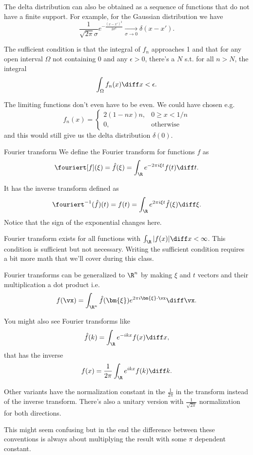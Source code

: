 \begin{frame}
	The delta distribution can also be obtained as a sequence of functions that do not have a finite support. For example, for the Gaussian distribution we have
	\[ \frac{1}{\sqrt{2\pi}\sigma} e^{-\frac{(x-x')^2}{2 \sigma^2}} \xrightarrow[\sigma \to 0]{} \delta(x-x'). \]
	
	\pause
	{\color{olive}
	The sufficient condition is that the integral of $ f_n $ approaches 1 and that for any open interval $ \Omega $ not containing 0 and any $ \epsilon>0 $, there's a $ N $ s.t. for all $ n > N $, the integral 
	\[ \int_\Omega f_n(x) \diff x < \epsilon. \]}
	
	\pause
	The limiting functions don't even have to be even. We could have chosen e.g. 
	\[ f_n(x) = \begin{cases}
		2(1-n x)n, & 0 \geq x < 1/n \\
		0, & \text{otherwise}
	\end{cases} \]
	and this would still give us the delta distribution $ \delta(0). $
\end{frame}

\begin{frame}{Fourier transform}
	We define the Fourier transform for functions $ f $ as 
	\[ \fouriert[f](\xi)=\hat{f}(\xi) = \int_\R e^{-2\pi i \xi t} f(t) \diff t. \]
	
	\pause
	It has the inverse transform defined as 
	\[ \fouriert^{-1} (\hat{f})(t) = f(t) = \int_\R e^{2\pi i \xi t} \hat{f}(\xi) \diff \xi. \]
	Notice that the sign of the exponential changes here.
	
	\pause
	{\color{olive} Fourier transform exists for all functions with $ \int_\R |f(x)| \diff x < \infty $. This condition is sufficient but not necessary. Writing the sufficient condition requires a bit more math that we'll cover during this class.}
\end{frame}

\begin{frame}
	Fourier transforms can be generalized to $ \R^n $ by making $ \xi $ and $ t $ vectors and their multiplication a dot product i.e. 
	\[ f(\vx) =  \int_{\R^n} \hat{f}(\bm{\xi}) e^{2\pi i \bm{\xi} \cdot \vx } \diff \vx . \]
	
	\pause
	You might also see Fourier transforms like
	\[ \hat{f}(k) = \int_\R e^{-ikx} f(x) \diff x, \]
	that has the inverse 
	$$ f(x) = \frac{1}{2\pi} \int_\R e^{ikx} f(k) \diff k. $$
	
	\pause
	Other variants have the normalization constant in the $ \frac{1}{2\pi} $ in the transform instead of the inverse transform. There's also a unitary version with $ \frac{1}{\sqrt{2\pi}} $ normalization for both directions. 
	
	\pause
	This might seem confusing but in the end the difference between these conventions is always about multiplying the result with some $ \pi $ dependent constant.
\end{frame}

